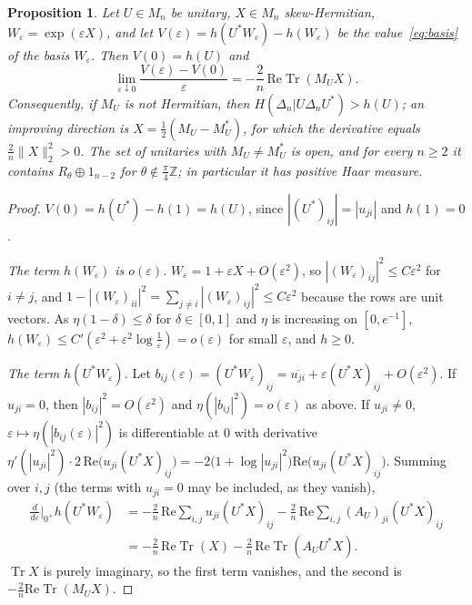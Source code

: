 \documentclass[11pt]{article}
\DeclareMathOperator{\Tr}{Tr}
\newcommand{\Z}{\mathbb{Z}}
\theoremstyle{plain}
\newtheorem{proposition}[theorem]{Proposition}
\theoremstyle{definition}
\theoremstyle{remark}
\begin{document}
\begin{proposition}\label{prop:firstorder}
Let $U\in M_n$ be unitary, $X\in M_n$ skew-Hermitian, $W_\varepsilon=\exp(\varepsilon X)$, and let
$V(\varepsilon)=h(U^*W_\varepsilon)-h(W_\varepsilon)$ be the value~\eqref{eq:basis} of the basis $W_\varepsilon$. Then $V(0)=h(U)$
and
\[
  \lim_{\varepsilon\downarrow0}\frac{V(\varepsilon)-V(0)}{\varepsilon}=-\frac2n\,\mathrm{Re}\Tr(M_UX).
\]
Consequently, if $M_U$ is not Hermitian, then $H(\Delta_n|U\Delta_nU^*)>h(U)$; an improving direction is
$X=\frac12(M_U-M_U^*)$, for which the derivative equals $\frac2n\|X\|_2^2>0$. The set of unitaries with $M_U\ne M_U^*$ is
open, and for every $n\ge2$ it contains $R_\theta\oplus1_{n-2}$ for $\theta\notin\frac\pi4\Z$; in particular it has
positive Haar measure.
\end{proposition}
\begin{proof}
$V(0)=h(U^*)-h(1)=h(U)$, since $|(U^*)_{ij}|=|u_{ji}|$ and $h(1)=0$.

\emph{The term $h(W_\varepsilon)$ is $o(\varepsilon)$.} $W_\varepsilon=1+\varepsilon X+O(\varepsilon^2)$, so $|(W_\varepsilon)_{ij}|^2\le
C\varepsilon^2$ for $i\ne j$, and $1-|(W_\varepsilon)_{ii}|^2=\sum_{j\ne i}|(W_\varepsilon)_{ij}|^2\le C\varepsilon^2$ because the rows are unit
vectors. As $\eta(1-\delta)\le\delta$ for $\delta\in[0,1]$ and $\eta$ is increasing on $[0,e^{-1}]$, $h(W_\varepsilon)\le
C'(\varepsilon^2+\varepsilon^2\log\frac1\varepsilon)=o(\varepsilon)$ for small $\varepsilon$, and $h\ge0$.

\emph{The term $h(U^*W_\varepsilon)$.} Let $b_{ij}(\varepsilon)=(U^*W_\varepsilon)_{ij}=\overline{u_{ji}}+\varepsilon(U^*X)_{ij}+O(\varepsilon^2)$. If $u_{ji}=0$,
then $|b_{ij}|^2=O(\varepsilon^2)$ and $\eta(|b_{ij}|^2)=o(\varepsilon)$ as above. If $u_{ji}\ne0$, $\varepsilon\mapsto\eta(|b_{ij}(\varepsilon)|^2)$ is
differentiable at $0$ with derivative
$\eta'(|u_{ji}|^2)\cdot2\,\mathrm{Re}\bigl(u_{ji}(U^*X)_{ij}\bigr)=-2\bigl(1+\log|u_{ji}|^2\bigr)\mathrm{Re}\bigl(u_{ji}(U^*X)_{ij}\bigr)$.
Summing over $i,j$ (the terms with $u_{ji}=0$ may be included, as they vanish),
\begin{align*}
  \frac{d}{d\varepsilon}\Big|_{0^+}h(U^*W_\varepsilon)
  &=-\frac2n\,\mathrm{Re}\sum_{i,j}u_{ji}(U^*X)_{ij}-\frac2n\,\mathrm{Re}\sum_{i,j}(A_U)_{ji}(U^*X)_{ij}\\
  &=-\frac2n\,\mathrm{Re}\Tr(X)-\frac2n\,\mathrm{Re}\Tr(A_UU^*X).
\end{align*}
$\Tr X$ is purely imaginary, so the first term vanishes, and the second is $-\frac2n\mathrm{Re}\Tr(M_UX)$.


\end{proof}
\end{document}
